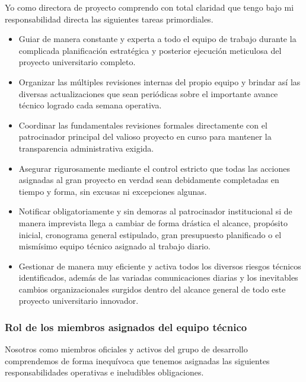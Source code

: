 \documentclass[11pt,spanish]{article}
\begin{document}
Yo como directora de proyecto comprendo con total claridad que tengo bajo mi responsabilidad directa las siguientes tareas primordiales.

\begin{itemize}
    \item Guiar de manera constante y experta a todo el equipo de trabajo durante la complicada planificación estratégica y posterior ejecución meticulosa del proyecto universitario completo.
    \item Organizar las múltiples revisiones internas del propio equipo y brindar así las diversas actualizaciones que sean periódicas sobre el importante avance técnico logrado cada semana operativa.
    \item Coordinar las fundamentales revisiones formales directamente con el patrocinador principal del valioso proyecto en curso para mantener la transparencia administrativa exigida.
    \item Asegurar rigurosamente mediante el control estricto que todas las acciones asignadas al gran proyecto en verdad sean debidamente completadas en tiempo y forma, sin excusas ni excepciones algunas.
    \item Notificar obligatoriamente y sin demoras al patrocinador institucional si de manera imprevista llega a cambiar de forma drástica el alcance, propósito inicial, cronograma general estipulado, gran presupuesto planificado o el mismísimo equipo técnico asignado al trabajo diario.
    \item Gestionar de manera muy eficiente y activa todos los diversos riesgos técnicos identificados, además de las variadas comunicaciones diarias y los inevitables cambios organizacionales surgidos dentro del alcance general de todo este proyecto universitario innovador.
\end{itemize}

\subsubsection{Rol de los miembros asignados del equipo técnico}

Nosotros como miembros oficiales y activos del grupo de desarrollo comprendemos de forma inequívoca que tenemos asignadas las siguientes responsabilidades operativas e ineludibles obligaciones.
\end{document}

